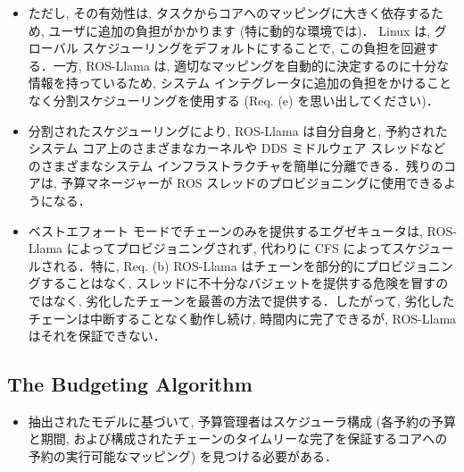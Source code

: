 \begin{frame}{}
    \begin{itemize}
        \item ただし, その有効性は, タスクからコアへのマッピングに大きく依存するため, ユーザに追加の負担がかかります (特に動的な環境では)． Linux は, グローバル スケジューリングをデフォルトにすることで, この負担を回避する．一方, ROS-Llama は, 適切なマッピングを自動的に決定するのに十分な情報を持っているため, システム インテグレータに追加の負担をかけることなく分割スケジューリングを使用する (Req. (e) を思い出してください)．
    \end{itemize}
\end{frame}

\begin{frame}{}
    \begin{itemize}
        \item 分割されたスケジューリングにより, ROS-Llama は自分自身と, 予約されたシステム コア上のさまざまなカーネルや DDS ミドルウェア スレッドなどのさまざまなシステム インフラストラクチャを簡単に分離できる．残りのコアは, 予算マネージャーが ROS スレッドのプロビジョニングに使用できるようになる．
    \end{itemize}
\end{frame}

\begin{frame}{}
    \begin{itemize}
        \item ベストエフォート モードでチェーンのみを提供するエグゼキュータは, ROS-Llama によってプロビジョニングされず, 代わりに CFS によってスケジュールされる．特に, Req. (b) ROS-Llama はチェーンを部分的にプロビジョニングすることはなく, スレッドに不十分なバジェットを提供する危険を冒すのではなく, 劣化したチェーンを最善の方法で提供する．したがって, 劣化したチェーンは中断することなく動作し続け, 時間内に完了できるが, ROS-Llama はそれを保証できない．
    \end{itemize}
\end{frame}


\subsection{The Budgeting Algorithm}
\label{ssec: the budgeting algorithm}

\begin{frame}{}
    \begin{itemize}
        \item 抽出されたモデルに基づいて, 予算管理者はスケジューラ構成 (各予約の予算と期間, および構成されたチェーンのタイムリーな完了を保証するコアへの予約の実行可能なマッピング) を見つける必要がある．
    \end{itemize}
\end{frame}

